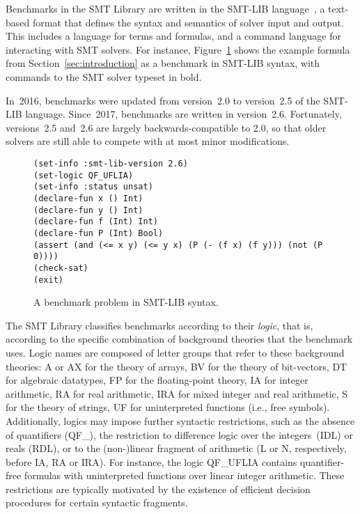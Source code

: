 \documentclass[twoside,11pt]{article}
\begin{document}
Benchmarks in the SMT Library are written in the SMT-LIB
language~\cite{BarFT-RR-17}, a text-based format that defines the
syntax and semantics of solver input and output.  This includes a
language for terms and formulas, and a command language for
interacting with SMT solvers.  For instance,
Figure~\ref{fig:smtlib-example} shows the example formula from
Section~\ref{sec:introduction} as a benchmark in SMT-LIB syntax, with
commands to the SMT solver typeset in bold.

In~2016, benchmarks were updated from version~2.0 to version~2.5 of
the SMT-LIB language.  Since~2017, benchmarks are written in
version~2.6.  Fortunately, versions~2.5 and~2.6 are largely
backwards-compatible to 2.0, so that older solvers are still able to
compete with at most minor modifications.

\begin{figure}
\begin{lstlisting}
(set-info :smt-lib-version 2.6)
(set-logic QF_UFLIA)
(set-info :status unsat)
(declare-fun x () Int)
(declare-fun y () Int)
(declare-fun f (Int) Int)
(declare-fun P (Int) Bool)
(assert (and (<= x y) (<= y x) (P (- (f x) (f y))) (not (P 0))))
(check-sat)
(exit)
\end{lstlisting}
\caption{A benchmark problem in SMT-LIB syntax.}
\label{fig:smtlib-example}
\end{figure}

The SMT Library classifies benchmarks according to their \emph{logic},
that is, according to the specific combination of background theories
that the benchmark uses.  Logic names are composed of letter groups
that refer to these background theories: {A} or {AX} for the theory of
arrays, {BV} for the theory of bit-vectors, {DT} for algebraic
datatypes, {FP} for the floating-point theory, {IA} for integer
arithmetic, {RA} for real arithmetic, {IRA} for mixed integer and real
arithmetic, {S} for the theory of strings, {UF} for uninterpreted
functions (i.e., free symbols).  Additionally, logics may impose
further syntactic restrictions, such as the absence of quantifiers
({QF\_}), the restriction to difference logic over the
integers~({IDL}) or reals ({RDL}), or to the (non-)linear fragment of
arithmetic ({L} or {N}, respectively, before {IA}, {RA} or {IRA}).
For instance, the logic QF\_UFLIA contains quantifier-free formulas
with uninterpreted functions over linear integer arithmetic.  These
restrictions are typically motivated by the existence of efficient
decision procedures for certain syntactic fragments.
\end{document}
